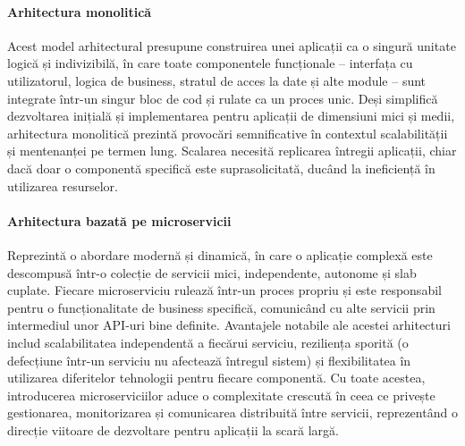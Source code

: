 \documentclass[12pt, a4paper, oneside, romanian]{teza-upb}
\begin{document}
	\paragraph{Arhitectura monolitică}
	Acest model arhitectural \cite{mono} presupune construirea unei aplicații ca o singură unitate logică și indivizibilă, în care toate componentele funcționale – interfața cu utilizatorul, logica de business, stratul de acces la date și alte module – sunt integrate într-un singur bloc de cod și rulate ca un proces unic. Deși simplifică dezvoltarea inițială și implementarea pentru aplicații de dimensiuni mici și medii, arhitectura monolitică prezintă provocări semnificative în contextul scalabilității și mentenanței pe termen lung. Scalarea necesită replicarea întregii aplicații, chiar dacă doar o componentă specifică este suprasolicitată, ducând la ineficiență în utilizarea resurselor.
	
	\paragraph{Arhitectura bazată pe microservicii}
	Reprezintă o abordare modernă și dinamică, în care o aplicație complexă este descompusă într-o colecție de servicii mici, independente, autonome și slab cuplate. Fiecare microserviciu rulează într-un proces propriu și este responsabil pentru o funcționalitate de business specifică, comunicând cu alte servicii prin intermediul unor API-uri bine definite. Avantajele notabile ale acestei arhitecturi includ scalabilitatea independentă a fiecărui serviciu, reziliența sporită (o defecțiune într-un serviciu nu afectează întregul sistem) și flexibilitatea în utilizarea diferitelor tehnologii pentru fiecare componentă. Cu toate acestea, introducerea microserviciilor aduce o complexitate crescută în ceea ce privește gestionarea, monitorizarea și comunicarea distribuită între servicii, reprezentând o direcție viitoare de dezvoltare pentru aplicații la scară largă.
	
	
\end{document}
